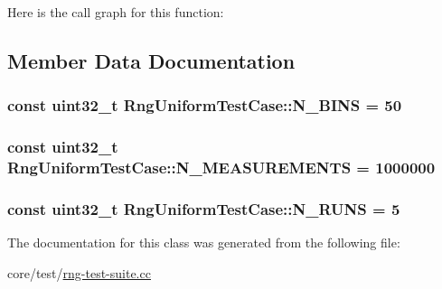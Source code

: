 Here is the call graph for this function\+:




\subsection{Member Data Documentation}
\subsubsection[{\texorpdfstring{N\+\_\+\+B\+I\+NS}{N_BINS}}]{\setlength{\rightskip}{0pt plus 5cm}const uint32\+\_\+t Rng\+Uniform\+Test\+Case\+::\+N\+\_\+\+B\+I\+NS = 50\hspace{0.3cm}{\ttfamily [static]}}\hypertarget{classRngUniformTestCase_a7cd2b3c08e99885890ee016351b72a18}{}\label{classRngUniformTestCase_a7cd2b3c08e99885890ee016351b72a18}
\subsubsection[{\texorpdfstring{N\+\_\+\+M\+E\+A\+S\+U\+R\+E\+M\+E\+N\+TS}{N_MEASUREMENTS}}]{\setlength{\rightskip}{0pt plus 5cm}const uint32\+\_\+t Rng\+Uniform\+Test\+Case\+::\+N\+\_\+\+M\+E\+A\+S\+U\+R\+E\+M\+E\+N\+TS = 1000000\hspace{0.3cm}{\ttfamily [static]}}\hypertarget{classRngUniformTestCase_a1b87c0bce87620bf39e371bf5782abe8}{}\label{classRngUniformTestCase_a1b87c0bce87620bf39e371bf5782abe8}
\subsubsection[{\texorpdfstring{N\+\_\+\+R\+U\+NS}{N_RUNS}}]{\setlength{\rightskip}{0pt plus 5cm}const uint32\+\_\+t Rng\+Uniform\+Test\+Case\+::\+N\+\_\+\+R\+U\+NS = 5\hspace{0.3cm}{\ttfamily [static]}}\hypertarget{classRngUniformTestCase_a8e497dbf81e4a701e28039e280be27d6}{}\label{classRngUniformTestCase_a8e497dbf81e4a701e28039e280be27d6}


The documentation for this class was generated from the following file\+:\begin{DoxyCompactItemize}
\item 
core/test/\hyperlink{rng-test-suite_8cc}{rng-\/test-\/suite.\+cc}\end{DoxyCompactItemize}
